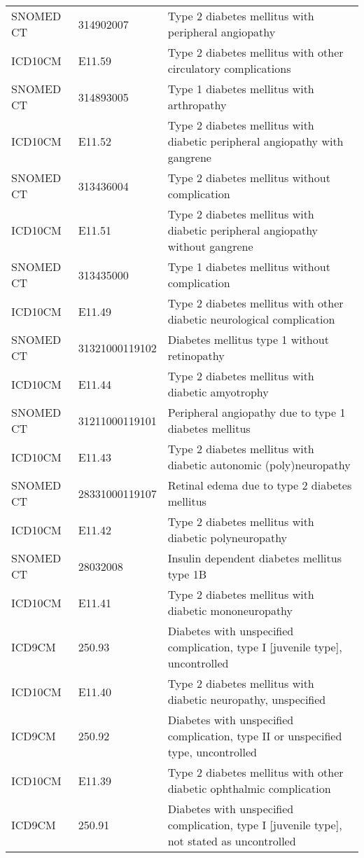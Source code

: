 \begin{table}[ht]
\begin{tabular}{lll}
  SNOMED CT & 314902007 & Type 2 diabetes mellitus with peripheral angiopathy \\ 
  ICD10CM & E11.59 & Type 2 diabetes mellitus with other circulatory complications \\ 
  SNOMED CT & 314893005 & Type 1 diabetes mellitus with arthropathy \\ 
  ICD10CM & E11.52 & Type 2 diabetes mellitus with diabetic peripheral angiopathy with gangrene \\ 
  SNOMED CT & 313436004 & Type 2 diabetes mellitus without complication \\ 
  ICD10CM & E11.51 & Type 2 diabetes mellitus with diabetic peripheral angiopathy without gangrene \\ 
  SNOMED CT & 313435000 & Type 1 diabetes mellitus without complication \\ 
  ICD10CM & E11.49 & Type 2 diabetes mellitus with other diabetic neurological complication \\ 
  SNOMED CT & 31321000119102 & Diabetes mellitus type 1 without retinopathy \\ 
  ICD10CM & E11.44 & Type 2 diabetes mellitus with diabetic amyotrophy \\ 
  SNOMED CT & 31211000119101 & Peripheral angiopathy due to type 1 diabetes mellitus \\ 
  ICD10CM & E11.43 & Type 2 diabetes mellitus with diabetic autonomic (poly)neuropathy \\ 
  SNOMED CT & 28331000119107 & Retinal edema due to type 2 diabetes mellitus \\ 
  ICD10CM & E11.42 & Type 2 diabetes mellitus with diabetic polyneuropathy \\ 
  SNOMED CT & 28032008 & Insulin dependent diabetes mellitus type 1B \\ 
  ICD10CM & E11.41 & Type 2 diabetes mellitus with diabetic mononeuropathy \\ 
  ICD9CM & 250.93 & Diabetes with unspecified complication, type I [juvenile type], uncontrolled \\ 
  ICD10CM & E11.40 & Type 2 diabetes mellitus with diabetic neuropathy, unspecified \\ 
  ICD9CM & 250.92 & Diabetes with unspecified complication, type II or unspecified type, uncontrolled \\ 
  ICD10CM & E11.39 & Type 2 diabetes mellitus with other diabetic ophthalmic complication \\ 
  ICD9CM & 250.91 & Diabetes with unspecified complication, type I [juvenile type], not stated as uncontrolled \\ 

\end{tabular}
\end{table}
